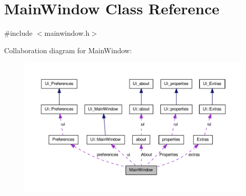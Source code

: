 \hypertarget{classMainWindow}{
\section{MainWindow Class Reference}
\label{classMainWindow}
}


{\ttfamily \#include $<$mainwindow.h$>$}



Collaboration diagram for MainWindow:
\nopagebreak
\begin{figure}[H]
\begin{center}
\leavevmode
\includegraphics[width=400pt]{classMainWindow__coll__graph}
\end{center}
\end{figure}

